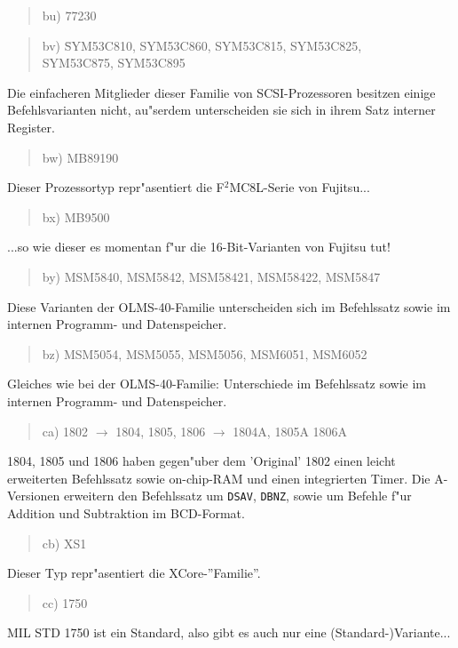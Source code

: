 \documentclass[12pt,a4paper,twoside]{report}
\newcommand{\tty}[1]{{\tt #1}}
\begin{document}
\begin{quote}
bu) 77230
\end{quote}
\begin{quote}
\begin{tabbing}
bv) \= SYM53C810, SYM53C860, SYM53C815, SYM53C825, \\
    \> SYM53C875, SYM53C895
\end{tabbing}
\end{quote}
Die einfacheren Mitglieder dieser Familie von SCSI-Prozessoren besitzen
einige Befehlsvarianten nicht, au"serdem unterscheiden sie sich in ihrem
Satz interner Register.
\begin{quote}
bw) MB89190
\end{quote}
Dieser Prozessortyp repr"asentiert die F$^{2}$MC8L-Serie von Fujitsu...
\begin{quote}
bx) MB9500
\end{quote}
...so wie dieser es momentan f"ur die 16-Bit-Varianten von Fujitsu tut!
\begin{quote}
by) MSM5840, MSM5842, MSM58421, MSM58422, MSM5847
\end{quote}
Diese Varianten der OLMS-40-Familie unterscheiden sich im
Befehlssatz sowie im internen Programm- und Datenspeicher.
\begin{quote}
bz) MSM5054, MSM5055, MSM5056, MSM6051, MSM6052
\end{quote}
Gleiches wie bei der OLMS-40-Familie: Unterschiede im
Befehlssatz sowie im internen Programm- und Datenspeicher.
\begin{quote}
ca) 1802 $\rightarrow$ 1804, 1805, 1806 $\rightarrow$ 1804A, 1805A
1806A
\end{quote}
1804, 1805 und 1806 haben gegen"uber dem 'Original' 1802 einen leicht
erweiterten Befehlssatz sowie on-chip-RAM und einen integrierten
Timer.  Die A-Versionen erweitern den Befehlssatz um \tty{DSAV},
\tty{DBNZ}, sowie um Befehle f"ur Addition und Subtraktion im
BCD-Format.
\begin{quote}
cb) XS1
\end{quote}
Dieser Typ repr"asentiert die XCore-''Familie''.
\begin{quote}
cc) 1750
\end{quote}
MIL STD 1750 ist ein Standard, also gibt es auch nur eine
(Standard-)Variante...
\end{document}
